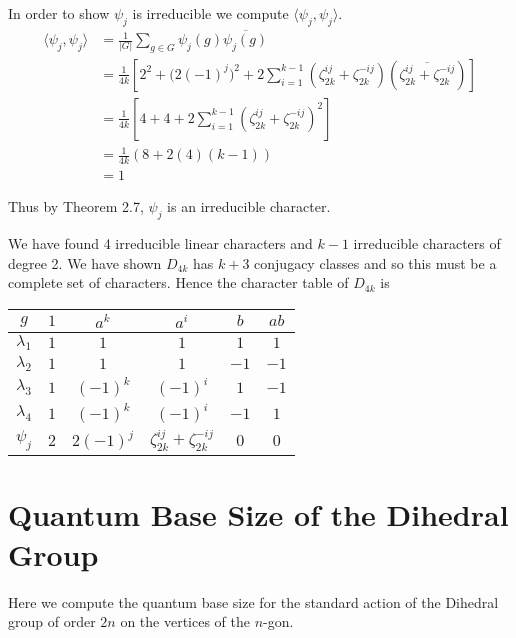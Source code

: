 In order to show $\psi_j$ is irreducible we compute $\langle \psi_j, \psi_j \rangle$.
\begin{align*}
    \langle \psi_j, \psi_j \rangle &= \frac{1}{|G|}\sum_{g \in G} \psi_j(g) \overline{\psi_j(g)} \\
                           &= \frac{1}{4k}\left[2^2 + \bigl(2(-1)^j\bigr)^2 + 
                               2\sum_{i=1}^{k-1}\left(\zeta_{2k}^{ij} + 
                               \zeta_{2k}^{-ij}\right)\left(\overline{\zeta_{2k}^{ij} + 
                       \zeta_{2k}^{-ij}}\right)\right] \\
%                             
               &= \frac{1}{4k}\left[ 4 + 4 + 2\sum_{i=1}^{k-1}\left(\zeta_{2k}^{ij} + \zeta_{2k}^{-ij}\right)^2 
               \right] \\
               &= \frac{1}{4k}(8 + 2(4)(k-1)) \\
               &= 1 \end{align*}

Thus by Theorem 2.7, $\psi_j$ is an irreducible character. 

We have found 4 irreducible linear characters and $k-1$ irreducible characters of degree 2. We have shown $D_{4k}$ 
has $k+3$ conjugacy classes and so this must be a complete set of characters. Hence the character table of $D_{4k}$ 
is 

\begin{center}
\begin{tabular}{c|ccccc}
    $g$ &$1$ & $a^k$ & $a^i$ & $b$ & $ab$ \\ \hline
    $\lambda_1$ & $1$ & $1$ & $1$ & $1$ & $1$ \\
    $\lambda_2$ & $1$ & $1$ & $1$ & $-1$ & $-1$ \\
    $\lambda_3$ & $1$ & $(-1)^k$ & $(-1)^i$ & $1$ & $-1$ \\
    $\lambda_4$ & $1$ & $(-1)^k$ & $(-1)^i$ & $-1$ & $1$ \\
    $\psi_j$ & $2$ & $2(-1)^j$ & $\zeta_{2k}^{ij} + \zeta_{2k}^{-ij}$ & $0$ & $0$
\end{tabular}
\end{center}

\section{Quantum Base Size of the Dihedral Group}

Here we compute the quantum base size for the standard action of the Dihedral group of order $2n$ on the vertices 
of the $n$-gon.





